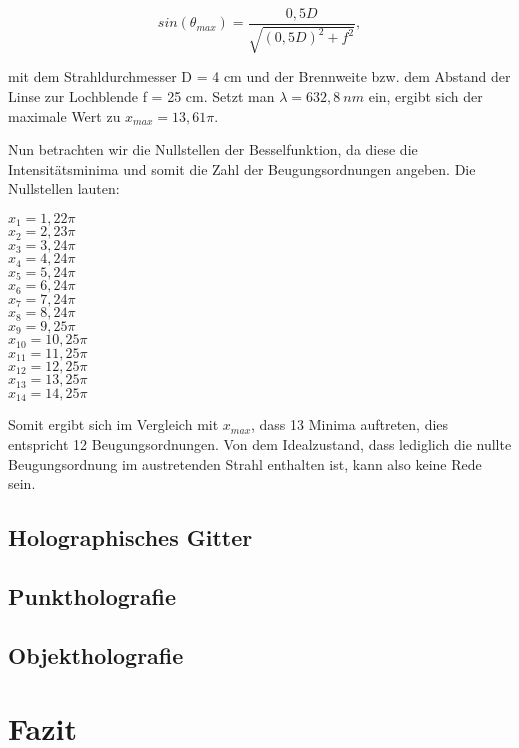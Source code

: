 \documentclass[bigchapter,colorback,accentcolor=tud4b,linedtoc,11pt]{tudreport}
\begin{document}
$$sin(\theta_{max}) = \frac{0,5 D}{\sqrt{(0,5 D)^2 + f^2}},$$

mit dem Strahldurchmesser D = 4 cm und der Brennweite bzw. dem Abstand der Linse zur Lochblende f = 25 cm. Setzt man $\lambda = 632,8~nm$ ein, ergibt sich der maximale Wert zu $x_{max} = 13,61 \pi$.

Nun betrachten wir die Nullstellen der Besselfunktion, da diese die Intensitätsminima und somit die Zahl der Beugungsordnungen angeben. Die Nullstellen lauten: 

\begin{center}
$x_1 = 1,22 \pi$ \\
$x_2 = 2,23 \pi$ \\
$x_3 = 3,24 \pi$ \\
$x_4 = 4,24 \pi$ \\
$x_5 = 5,24 \pi$ \\
$x_6 = 6,24 \pi$ \\
$x_7 = 7,24 \pi$ \\
$x_8 = 8,24 \pi$ \\
$x_9 = 9,25 \pi$ \\
$x_{10} = 10,25 \pi$ \\
$x_{11} = 11,25 \pi$ \\
$x_{12} = 12,25 \pi$ \\
$x_{13} = 13,25 \pi$ \\
$x_{14} = 14,25 \pi$
\end{center}

Somit ergibt sich im Vergleich mit $x_{max}$, dass 13 Minima auftreten, dies entspricht 12 Beugungsordnungen. Von dem Idealzustand, dass lediglich die nullte Beugungsordnung im austretenden Strahl enthalten ist, kann also keine Rede sein.

\section{Holographisches Gitter}

\section{Punktholografie}

\section{Objektholografie}

\chapter{Fazit}

\cleardoublepage{}
\newpage
\begin{thebibliography}{100}
\end{thebibliography}
\end{document}
